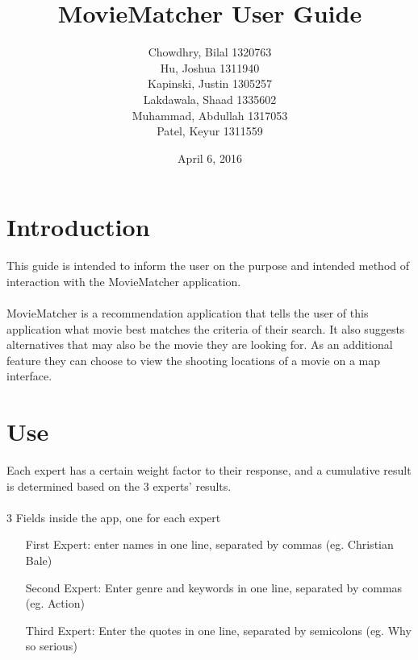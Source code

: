 \documentclass[11pt,a4paper]{article}
\date{April 6, 2016}
\author{Chowdhry, Bilal 1320763\\
Hu, Joshua 1311940\\
Kapinski, Justin 1305257\\
Lakdawala, Shaad 1335602\\
Muhammad, Abdullah 1317053\\
Patel, Keyur 1311559}
\title{MovieMatcher User Guide}
\begin{document}
\clearpage
\maketitle
\thispagestyle{empty}
\newpage

\section{Introduction}
This guide is intended to inform the user on the purpose and intended method of interaction with the MovieMatcher application.\\
\\
MovieMatcher is a recommendation application that tells the user of this application what movie best matches the criteria of their search. It also suggests alternatives that may also be the movie they are looking for. As an additional feature they can choose to view the shooting locations of a movie on a map interface.

\section{Use}
Each expert has a certain weight factor to their response, and a cumulative result is determined based on the 3 experts' results.\\
\\
3 Fields inside the app, one for each expert
\begin{itemize}
\item[First Expert:] enter names in one line, separated by commas (eg. Christian Bale)
\item[Second Expert:] Enter genre and keywords in one line, separated by commas (eg. Action)
\item[Third Expert:] Enter the quotes in one line, separated by semicolons (eg. Why so serious)
\end{itemize}
\end{document}
